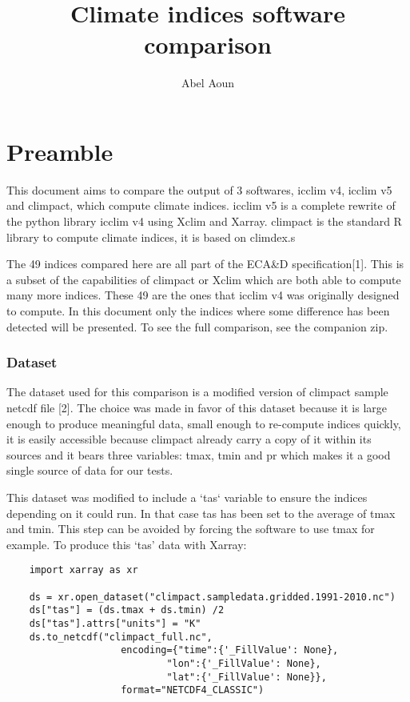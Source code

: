 \documentclass[a4paper,11pt]{article}
\title{Climate indices software comparison}
\author{Abel Aoun}
\begin{document}
\maketitle
\part*{Preamble}
    This document aims to compare the output of 3 softwares, icclim v4, icclim v5 and climpact, which 
    compute climate indices.
    icclim v5 is a complete rewrite of the python library icclim v4 using Xclim and Xarray.
    climpact is the standard R library to compute climate indices, it is based on climdex.s

    The 49 indices compared here are all part of the ECA\&D specification[1].
    This is a subset of the capabilities of climpact or Xclim which are both able to compute many 
    more indices.
    These 49 are the ones that icclim v4 was originally designed to compute.
    In this document only the indices where some difference has been detected will be presented.
    To see the full comparison, see the companion zip.
\section{Dataset}
    The dataset used for this comparison is a modified version of climpact sample netcdf file [2].
    The choice was made in favor of this dataset because it is large enough to produce meaningful data,
    small enough to re-compute indices quickly, it is easily accessible because climpact already 
    carry a copy of it within its sources and it bears three variables: tmax, tmin and pr which 
    makes it a good single source of data for our tests.

    This dataset was modified to include a `tas` variable to ensure the indices depending on it could
    run. In that case tas has been set to the average of tmax and tmin.
    This step can be avoided by forcing the software to use tmax for example.
    To produce this `tas' data with Xarray:
    \begin{lstlisting}
    import xarray as xr

    ds = xr.open_dataset("climpact.sampledata.gridded.1991-2010.nc")
    ds["tas"] = (ds.tmax + ds.tmin) /2
    ds["tas"].attrs["units"] = "K"
    ds.to_netcdf("climpact_full.nc",
                    encoding={"time":{'_FillValue': None},
                            "lon":{'_FillValue': None},
                            "lat":{'_FillValue': None}},
                    format="NETCDF4_CLASSIC")
    \end{lstlisting}
\end{document}
